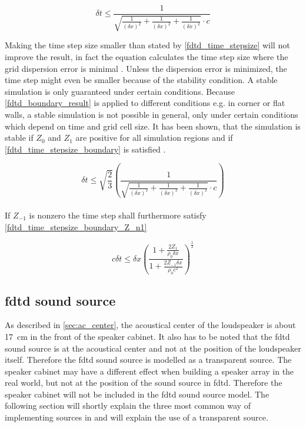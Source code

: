 \begin{equation}\label{fdtd_time_stepsize}
\delta t \leq \frac{1}{\sqrt{\frac{1}{(\delta x)^2}+\frac{1}{(\delta x)^2}+\frac{1}{(\delta x)^2} }\cdot c}
\end{equation}
        \startexplain
    \stopexplain
    
Making the time step size smaller than stated by \autoref{fdtd_time_stepsize} will not improve the result, in fact the equation calculates the time step size where the grid dispersion error is minimal \citep{Kunz1993}. Unless the dispersion error is minimized, the time step might even be  smaller because of the stability condition. 
A stable simulation is only guaranteed under certain conditions. Because \autoref{fdtd_boundary_result} is applied to different conditions e.g. in corner or flat walls, a stable simulation is not possible in general, only under certain conditions which depend on time and grid cell size. It has been shown, that the simulation is stable if $Z_0$ and $Z_{1}$ are positive for all simulation regions and if \autoref{fdtd_time_stepsize_boundary} is satisfied \citep{finiteproblems}.

\begin{equation}\label{fdtd_time_stepsize_boundary}
\delta t \leq \sqrt{\frac{2}{3}}  \left( \frac{1}{\sqrt{\frac{1}{(\delta x)^2}+\frac{1}{(\delta x)^2}+\frac{1}{(\delta x)^2} }\cdot c} \right)
\end{equation}\\


If $Z_{-1}$ is nonzero the time step shall furthermore satisfy \autoref{fdtd_time_stepsize_boundary_Z_n1}

\begin{equation}\label{fdtd_time_stepsize_boundary_Z_n1}
c \delta t \leq \delta x \left(   \frac{1+\frac{2Z_1}{\rho_0 \delta x}}{1+\frac{2Z_{-1} \delta x}{\rho_0 c^2}}  \right)^{\frac{1}{2}}
\end{equation}

\subsection{\gls{fdtd} sound source}
As described in \autoref{sec:ac_center}, the acoustical center of the loudspeaker is about \SI{17}{\centi\meter} in the front of the speaker cabinet. It also has to be noted that the \gls{fdtd} sound source is at the acoustical center and not at the position of the loudspeaker itself. Therefore the \gls{fdtd} sound source is modelled as a transparent source. The speaker cabinet may have a different effect when building a speaker array in the real world, but not at the position of the sound source in \gls{fdtd}. Therefore the speaker cabinet will not be included in the \gls{fdtd} sound source model. The following section will shortly explain the three most common way of implementing sources in \citep{FDTDsource} and will explain the use of a transparent source. \\

